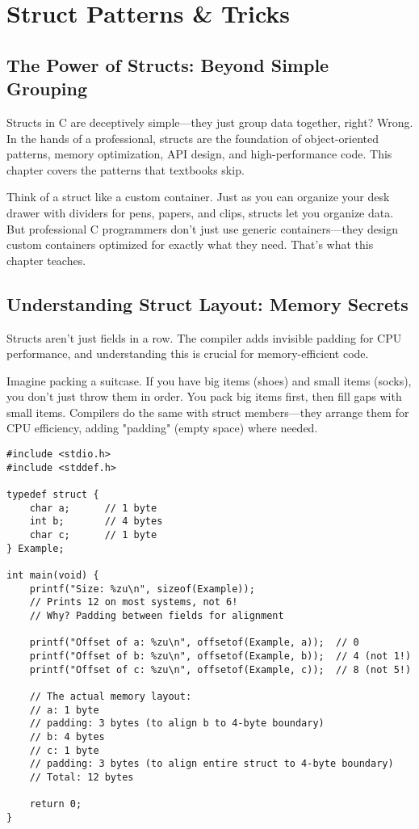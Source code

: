 \chapter{Struct Patterns \& Tricks}

\section{The Power of Structs: Beyond Simple Grouping}

Structs in C are deceptively simple—they just group data together, right? Wrong. In the hands of a professional, structs are the foundation of object-oriented patterns, memory optimization, API design, and high-performance code. This chapter covers the patterns that textbooks skip.

Think of a struct like a custom container. Just as you can organize your desk drawer with dividers for pens, papers, and clips, structs let you organize data. But professional C programmers don't just use generic containers—they design custom containers optimized for exactly what they need. That's what this chapter teaches.

\section{Understanding Struct Layout: Memory Secrets}

Structs aren't just fields in a row. The compiler adds invisible padding for CPU performance, and understanding this is crucial for memory-efficient code.

Imagine packing a suitcase. If you have big items (shoes) and small items (socks), you don't just throw them in order. You pack big items first, then fill gaps with small items. Compilers do the same with struct members—they arrange them for CPU efficiency, adding "padding" (empty space) where needed.

\begin{lstlisting}
#include <stdio.h>
#include <stddef.h>

typedef struct {
    char a;      // 1 byte
    int b;       // 4 bytes
    char c;      // 1 byte
} Example;

int main(void) {
    printf("Size: %zu\n", sizeof(Example));
    // Prints 12 on most systems, not 6!
    // Why? Padding between fields for alignment

    printf("Offset of a: %zu\n", offsetof(Example, a));  // 0
    printf("Offset of b: %zu\n", offsetof(Example, b));  // 4 (not 1!)
    printf("Offset of c: %zu\n", offsetof(Example, c));  // 8 (not 5!)

    // The actual memory layout:
    // a: 1 byte
    // padding: 3 bytes (to align b to 4-byte boundary)
    // b: 4 bytes
    // c: 1 byte
    // padding: 3 bytes (to align entire struct to 4-byte boundary)
    // Total: 12 bytes

    return 0;
}
\end{lstlisting}

